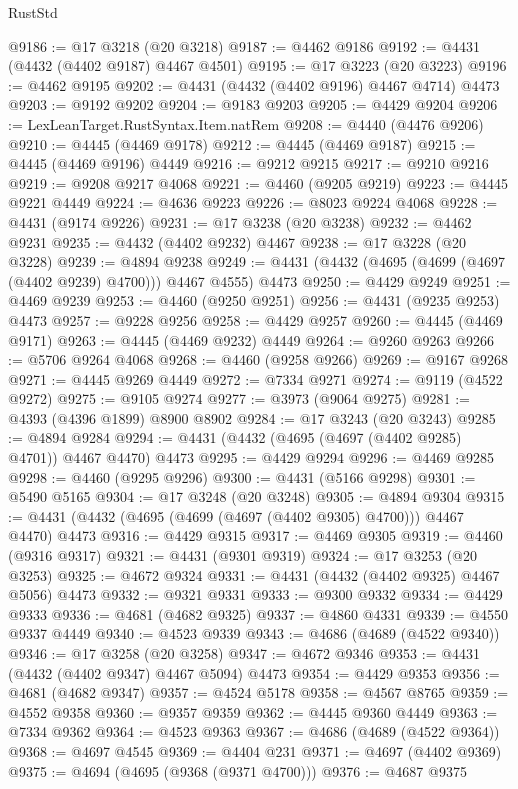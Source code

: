 \begin{lexlean}{RustStd}
\begin{coremodule}
@9186 := @17 @3218 (@20 @3218)
@9187 := @4462 @9186
@9192 := @4431 (@4432 (@4402 @9187) @4467 @4501)
@9195 := @17 @3223 (@20 @3223)
@9196 := @4462 @9195
@9202 := @4431 (@4432 (@4402 @9196) @4467 @4714) @4473
@9203 := @9192 @9202
@9204 := @9183 @9203
@9205 := @4429 @9204
@9206 := LexLeanTarget.RustSyntax.Item.natRem
@9208 := @4440 (@4476 @9206)
@9210 := @4445 (@4469 @9178)
@9212 := @4445 (@4469 @9187)
@9215 := @4445 (@4469 @9196) @4449
@9216 := @9212 @9215
@9217 := @9210 @9216
@9219 := @9208 @9217 @4068
@9221 := @4460 (@9205 @9219)
@9223 := @4445 @9221 @4449
@9224 := @4636 @9223
@9226 := @8023 @9224 @4068
@9228 := @4431 (@9174 @9226)
@9231 := @17 @3238 (@20 @3238)
@9232 := @4462 @9231
@9235 := @4432 (@4402 @9232) @4467
@9238 := @17 @3228 (@20 @3228)
@9239 := @4894 @9238
@9249 := @4431 (@4432 (@4695 (@4699 (@4697 (@4402 @9239) @4700))) @4467 @4555) @4473
@9250 := @4429 @9249
@9251 := @4469 @9239
@9253 := @4460 (@9250 @9251)
@9256 := @4431 (@9235 @9253) @4473
@9257 := @9228 @9256
@9258 := @4429 @9257
@9260 := @4445 (@4469 @9171)
@9263 := @4445 (@4469 @9232) @4449
@9264 := @9260 @9263
@9266 := @5706 @9264 @4068
@9268 := @4460 (@9258 @9266)
@9269 := @9167 @9268
@9271 := @4445 @9269 @4449
@9272 := @7334 @9271
@9274 := @9119 (@4522 @9272)
@9275 := @9105 @9274
@9277 := @3973 (@9064 @9275)
@9281 := @4393 (@4396 @1899) @8900 @8902
@9284 := @17 @3243 (@20 @3243)
@9285 := @4894 @9284
@9294 := @4431 (@4432 (@4695 (@4697 (@4402 @9285) @4701)) @4467 @4470) @4473
@9295 := @4429 @9294
@9296 := @4469 @9285
@9298 := @4460 (@9295 @9296)
@9300 := @4431 (@5166 @9298)
@9301 := @5490 @5165
@9304 := @17 @3248 (@20 @3248)
@9305 := @4894 @9304
@9315 := @4431 (@4432 (@4695 (@4699 (@4697 (@4402 @9305) @4700))) @4467 @4470) @4473
@9316 := @4429 @9315
@9317 := @4469 @9305
@9319 := @4460 (@9316 @9317)
@9321 := @4431 (@9301 @9319)
@9324 := @17 @3253 (@20 @3253)
@9325 := @4672 @9324
@9331 := @4431 (@4432 (@4402 @9325) @4467 @5056) @4473
@9332 := @9321 @9331
@9333 := @9300 @9332
@9334 := @4429 @9333
@9336 := @4681 (@4682 @9325)
@9337 := @4860 @4331
@9339 := @4550 @9337 @4449
@9340 := @4523 @9339
@9343 := @4686 (@4689 (@4522 @9340))
@9346 := @17 @3258 (@20 @3258)
@9347 := @4672 @9346
@9353 := @4431 (@4432 (@4402 @9347) @4467 @5094) @4473
@9354 := @4429 @9353
@9356 := @4681 (@4682 @9347)
@9357 := @4524 @5178
@9358 := @4567 @8765
@9359 := @4552 @9358
@9360 := @9357 @9359
@9362 := @4445 @9360 @4449
@9363 := @7334 @9362
@9364 := @4523 @9363
@9367 := @4686 (@4689 (@4522 @9364))
@9368 := @4697 @4545
@9369 := @4404 @231
@9371 := @4697 (@4402 @9369)
@9375 := @4694 (@4695 (@9368 (@9371 @4700)))
@9376 := @4687 @9375

\end{coremodule}
\end{lexlean}
